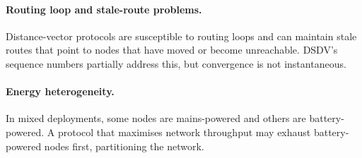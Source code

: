 \paragraph{Routing loop and stale-route problems.}
Distance-vector protocols are susceptible to routing loops and can maintain stale routes
that point to nodes that have moved or become unreachable. DSDV's sequence numbers
partially address this, but convergence is not instantaneous.

\paragraph{Energy heterogeneity.}
In mixed deployments, some nodes are mains-powered and others are battery-powered.
A protocol that maximises network throughput may exhaust battery-powered nodes first,
partitioning the network.
